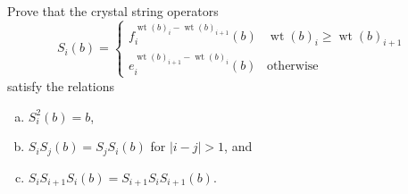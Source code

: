 \documentclass{article}
\newenvironment{problem}[2][Problem]{\begin{trivlist}
\item[\hskip \labelsep {\bfseries #1}\hskip \labelsep {\bfseries #2.}]}{\end{trivlist}}
\newcommand{\wt}{\operatorname{wt}}
\begin{document}
\pagebreak
\begin{problem}{5}
  Prove that the crystal string operators \[
    S_i(b) = \begin{cases}
      f_i^{\wt(b)_i - \wt(b)_{i+1}}(b) & \wt(b)_i \geq \wt(b)_{i+1} \\
      e_i^{\wt(b)_{i+1} - \wt(b)_i}(b) & \text{otherwise}
    \end{cases}
  \] satisfy the relations
  \begin{enumerate}[(a)]
    \item $S_i^2(b) = b$,
    \item $S_i S_j(b) = S_j S_i(b)$ for $|i - j| > 1$, and
    \item $S_i S_{i+1} S_i(b) = S_{i+1} S_i S_{i+1}(b)$.
  \end{enumerate}
\end{problem}
\end{document}
